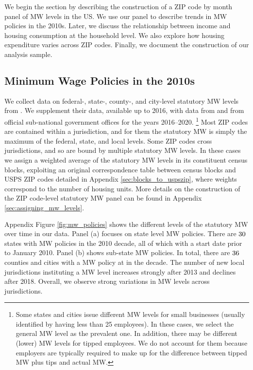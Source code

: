 
We begin the section by describing the construction of a ZIP code by month panel
of MW levels in the US. 
We use our panel to describe trends in MW policies in the 2010s.
Later, we discuss the relationship between income and housing consumption at the
household level.
We also explore how housing expenditure varies across ZIP codes.
Finally, we document the construction of our analysis sample.

\subsection{Minimum Wage Policies in the 2010s}
\label{sec:data_mw_panel}

We collect data on federal-, state-, county-, and city-level statutory MW levels 
from \textcite{VaghulZipperer2016}.
We supplement their data, available up to 2016, with data from 
\textcite{BerkeleyLaborCenter} and from official sub-national government offices 
for the years 2016--2020.%
\footnote{Some states and cities issue different MW levels for small businesses
(usually identified by having less than 25 employees).
In these cases, we select the general MW level as the prevalent one.
In addition, there may be different (lower) MW levels for tipped employees.
We do not account for them because employers are typically required to make up 
for the difference between tipped MW plus tips and actual MW.}
%
%
Most ZIP codes are contained within a jurisdiction, and for them the statutory 
MW is simply the maximum of the federal, state, and local levels.
Some ZIP codes cross jurisdictions, and so are bound by multiple statutory MW 
levels.
In these cases we assign a weighted average of the statutory MW levels in its
constituent census blocks, exploiting an original correspondence table between 
census blocks and USPS ZIP codes detailed in Appendix 
\ref{sec:blocks_to_uspszip}, where weights correspond to the number of housing
units.
More details on the construction of the ZIP code-level statutory MW panel 
can be found in Appendix \ref{sec:assigning_mw_levels}.

Appendix Figure \ref{fig:mw_policies} shows the different levels of the 
statutory MW over time in our data.
Panel (a) focuses on state level MW policies.
There are $\textnormal{30}$ states with MW policies in the 2010 decade, all of 
which with a start date prior to January 2010.
Panel (b) shows sub-state MW policies.
In total, there are $\textnormal{36}$ counties and cities with a MW policy at 
in the decade.
The number of new local jurisdictions instituting a MW level increases strongly 
after 2013 and declines after 2018.
Overall, we observe strong variations in MW levels across jurisdictions.

